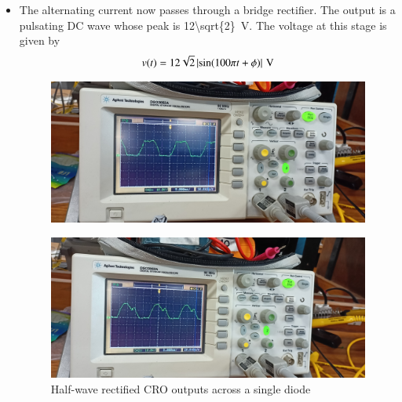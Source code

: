 \documentclass[journal,12pt,twocolumn]{IEEEtran}
\providecommand{\abs}[1]{\left\vert#1\right\vert}
\numberwithin{equation}{section}
\numberwithin{figure}{section}
\begin{document}
\begin{itemize}
	\item The alternating current now passes through a bridge rectifier. The output is a pulsating DC wave whose peak is \SI[parse-numbers=false]{12\sqrt{2}}{\volt}. The voltage at this stage is given by
	\begin{align}
		v(t) = \SI[parse-numbers=false]{12\sqrt{2}\abs{\sin(100\pi t + \phi)}}{\volt}
	\end{align}
	\begin{figure}[!ht]
		\centering
		\includegraphics[width=\columnwidth]{./figs/rectifier-1.jpg}
		\label{fig-rectifier-1}	
	\end{figure}
	\begin{figure}[!ht]
		\centering
		\includegraphics[width=\columnwidth]{./figs/rectifier-2.jpg}
		\caption{Half-wave rectified CRO outputs across a single diode}
		\label{fig-rectifier-2}	
	\end{figure}
	

\end{itemize}
\end{document}
